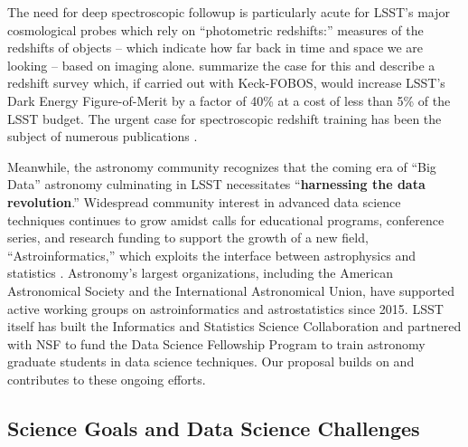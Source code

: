 \documentclass[oneside,11pt]{amsart}
\begin{document}
The need for deep spectroscopic followup is particularly acute for LSST's major cosmological probes which rely on
``photometric redshifts:'' measures of the redshifts of objects -- which indicate how far back in time and space we are
looking -- based on imaging alone.  \citet{newman15} summarize the case for this and describe a redshift survey which,
if carried out with Keck-FOBOS, would increase LSST's Dark Energy Figure-of-Merit by a factor of 40\% at a cost of less
than 5\% of the LSST budget.  The urgent case for spectroscopic redshift training has been the subject of numerous
publications \citep[e.g.,][]{laureijs11,masters15, hemmati18}.

Meanwhile, the astronomy community recognizes that the coming era of ``Big Data'' astronomy culminating in LSST
necessitates ``\textbf{harnessing the data revolution}.''  Widespread community interest in advanced data science
techniques continues to grow amidst calls for educational programs, conference series, and research funding to support
the growth of a new field, ``Astroinformatics,'' which exploits the interface between astrophysics and statistics
\citep{borne09}.  Astronomy's largest organizations, including the American Astronomical Society and the International
Astronomical Union, have supported active working groups on astroinformatics and astrostatistics since 2015.  LSST
itself has built the Informatics and Statistics Science Collaboration and partnered with NSF to fund the Data Science
Fellowship Program to train astronomy graduate students in data science techniques.  Our proposal builds on and
contributes to these ongoing efforts.




\subsection{Science Goals and Data Science Challenges}
\label{sec:goals}
\end{document}
